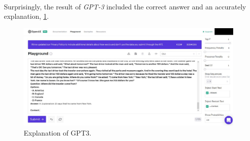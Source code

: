 \paragraph{}
Surprisingly, the result of \emph{GPT-3} included the correct answer and an accurately explanation, \ref{fig:gpt3-result-correct}.
\begin{figure}[h]
	\centering
	\includegraphics[scale=0.25]{images/gpt3-correct}
	\caption{Explanation of GPT3.}
	\label{fig:gpt3-result-correct}
\end{figure}
